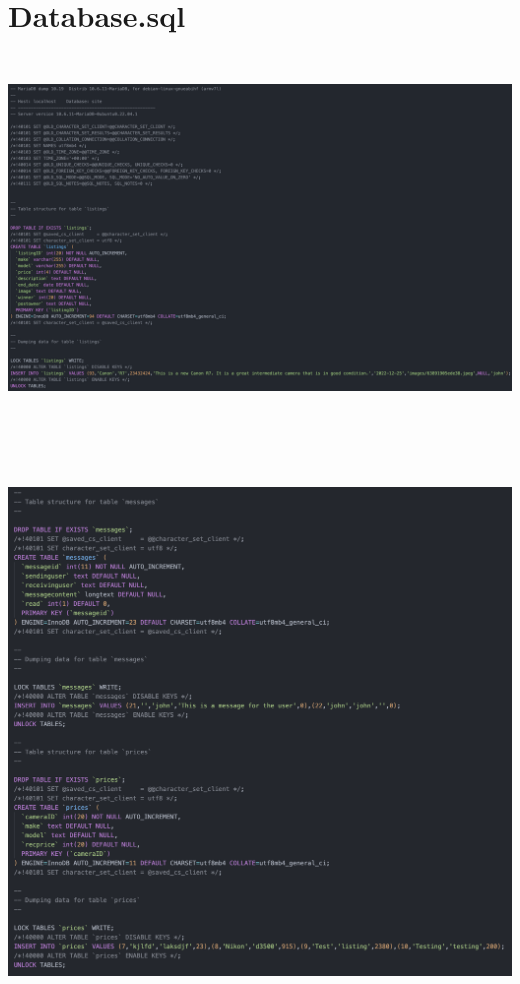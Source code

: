 \section*{Database.sql}\includegraphics[width=6.26806in,height=3.82153in]{ch6_appendix/media/image22.png}

\includegraphics[width=6.26806in,height=6.08403in]{ch6_appendix/media/image23.png}


